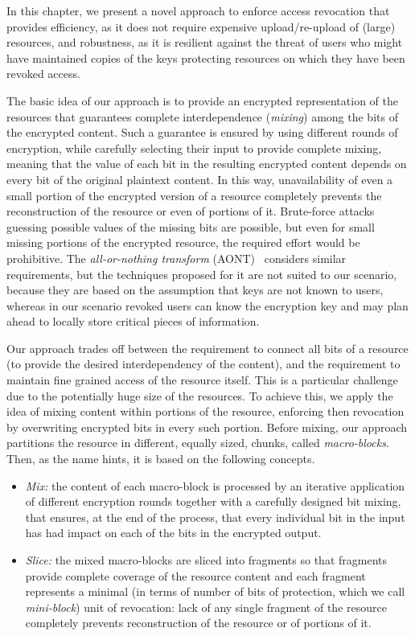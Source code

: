 \medskip
{}
In this chapter, we present a novel approach to enforce access revocation that provides efficiency, as it does not require expensive upload/re-upload of (large) resources, and robustness, as it is resilient against the threat of users who might have maintained copies of the keys protecting resources on which they have been revoked access.

The basic idea of our approach is to provide an encrypted representation of the resources that guarantees complete interdependence ({\em mixing\/}) among the bits of the encrypted content. Such a guarantee is ensured by using different rounds of encryption, while carefully selecting their input to provide complete mixing, meaning that the value of each bit in the resulting encrypted content depends on every bit of the original plaintext content. In this way, unavailability of even a small portion of the encrypted version of a resource completely prevents the reconstruction of the resource or even of portions of it. Brute-force attacks guessing possible values of the missing bits are possible, but even for small missing portions of the encrypted resource, the required effort would be prohibitive.
The {\em all-or-nothing transform} (AONT)~\cite{r97} considers similar requirements, but the techniques proposed for it are not suited to our scenario, because they are based on the assumption that keys are not known to users, whereas in our scenario revoked users can know the encryption key and may plan ahead to locally store critical pieces of information.

Our approach trades off between the requirement to connect all bits of a resource (to provide the desired interdependency of the content), and the requirement to maintain fine grained access of the resource itself. This is a particular challenge due to the potentially huge size of the resources. To achieve this, we apply the idea of mixing content within portions of the resource, enforcing then revocation by overwriting encrypted bits in every such portion. Before mixing, our approach partitions the resource in different, equally sized, chunks, called {\em macro-blocks\/}. Then, as the name hints, it is based on the following concepts.

\begin{itemize}

\item {\em Mix:\/} the content of each macro-block is processed by  an iterative application of different encryption rounds together with  a carefully designed bit mixing, that ensures, at the end of the process, that every individual bit in the input has had impact on each of the bits in the encrypted output.

\item {\em Slice:\/} the mixed macro-blocks are sliced into fragments so that  fragments provide complete coverage of the resource content and each fragment represents a minimal (in terms of number of bits of protection, which we call {\em mini-block\/}) unit of revocation: lack of any single fragment of the resource completely prevents reconstruction of the resource or of portions of it.
\end{itemize}

